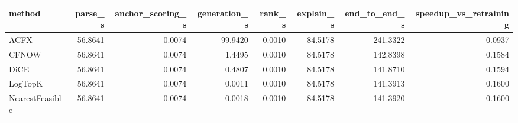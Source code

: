 \begin{tabular}{lrrrrrrr}
\toprule
         method &  parse\_s &  anchor\_scoring\_s &  generation\_s &  rank\_s &  explain\_s &  end\_to\_end\_s &  speedup\_vs\_retraining \\
\midrule
           ACFX &  56.8641 &            0.0074 &       99.9420 &  0.0010 &    84.5178 &      241.3322 &                 0.0937 \\
          CFNOW &  56.8641 &            0.0074 &        1.4495 &  0.0010 &    84.5178 &      142.8398 &                 0.1584 \\
           DiCE &  56.8641 &            0.0074 &        0.4807 &  0.0010 &    84.5178 &      141.8710 &                 0.1594 \\
        LogTopK &  56.8641 &            0.0074 &        0.0011 &  0.0010 &    84.5178 &      141.3913 &                 0.1600 \\
NearestFeasible &  56.8641 &            0.0074 &        0.0018 &  0.0010 &    84.5178 &      141.3920 &                 0.1600 \\
\bottomrule
\end{tabular}

